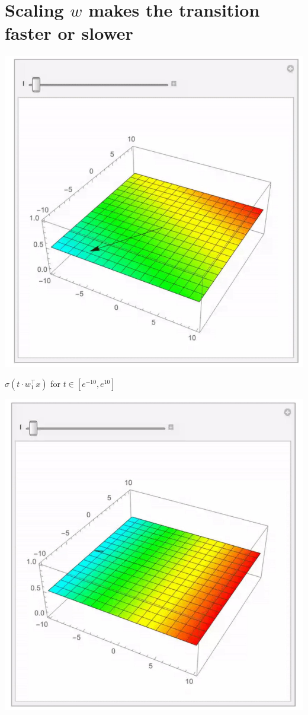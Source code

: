 \documentclass[10pt]{article}
\begin{document}
\section*{Scaling $w$ makes the transition faster or slower}
\begin{center}
\includegraphics[max width=\textwidth]{2023_12_30_261a5c67f471a6c49904g-10(1)}
\end{center}

$\sigma\left(t \cdot w_{1}^{\top} x\right)$ for $t \in\left[e^{-10}, e^{10}\right]$

\begin{center}
\includegraphics[max width=\textwidth]{2023_12_30_261a5c67f471a6c49904g-10}
\end{center}
\end{document}

